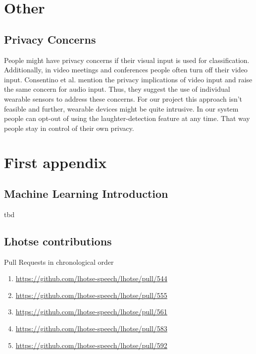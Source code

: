 \documentclass[bsc,frontabs,parskip,deptreport]{infthesis}
\begin{document}
\chapter{Other}
\section{Privacy Concerns}\label{privacy-concerns}
People might have privacy concerns if their visual input is used for classification.
Additionally, in video meetings and conferences people often turn off their video input.
Consentino et al. \citep{cosentino2016quantitative}  mention the privacy implications of video input and raise the same concern for audio input.
Thus, they suggest the use of individual wearable sensors to address these concerns.
For our project this approach isn't feasible and further, wearable devices might be quite intrusive.
In our system people can opt-out of using the laughter-detection feature at any time.
That way people stay in control of their own privacy.




\appendix
\chapter{First appendix}
\section{Machine Learning Introduction}\label{sec:ml-intro}
tbd 

\section{Lhotse contributions}
Pull Requests in chronological order 
\begin{enumerate}
    \item \url{https://github.com/lhotse-speech/lhotse/pull/544}
    \item \url{https://github.com/lhotse-speech/lhotse/pull/555}
    \item \url{https://github.com/lhotse-speech/lhotse/pull/561}
    \item \url{https://github.com/lhotse-speech/lhotse/pull/583}
    \item \url{https://github.com/lhotse-speech/lhotse/pull/592}
\end{enumerate}
%
\end{document}
